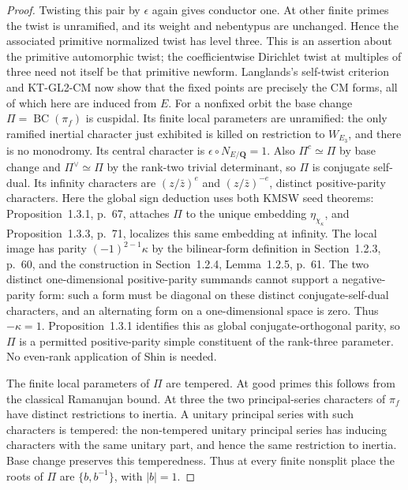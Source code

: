 \begin{proof}
Twisting this pair by $\epsilon$ again gives conductor one.
At other finite primes the twist is unramified, and its weight
and nebentypus are unchanged. Hence the associated primitive
normalized twist has level three. This is an assertion about
the primitive automorphic twist; the coefficientwise Dirichlet
twist at multiples of three need not itself be that primitive
newform.
Langlands's self-twist criterion and KT-GL2-CM now show that
the fixed points are precisely the CM forms, all of which here
are induced from $E$.
For a nonfixed orbit the base change $\Pi=\operatorname{BC}(\pi_f)$
is cuspidal. Its finite local parameters are unramified:
the only ramified inertial character just exhibited is killed
on restriction to $W_{E_3}$, and there is no monodromy.
Its central character is $\epsilon\circ N_{E/\mathbf Q}=1$.
Also $\Pi^c\simeq\Pi$ by base change and
$\Pi^\vee\simeq\Pi$ by the rank-two trivial determinant,
so $\Pi$ is conjugate self-dual.
Its infinity characters are $(z/\bar z)^e$ and $(z/\bar z)^{-e}$,
distinct positive-parity characters. Here the global sign deduction
uses both KMSW seed theorems: Proposition~1.3.1, p.~67,
attaches $\Pi$ to the unique embedding $\eta_{\chi_\kappa}$,
and Proposition~1.3.3, p.~71, localizes this same embedding
at infinity. The local image has parity $(-1)^{2-1}\kappa$
by the bilinear-form definition in Section~1.2.3, p.~60,
and the construction in Section~1.2.4, Lemma~1.2.5, p.~61.
The two distinct one-dimensional positive-parity summands
cannot support a negative-parity form: such a form must be
diagonal on these distinct conjugate-self-dual characters, and
an alternating form on a one-dimensional space is zero.
Thus $-\kappa=1$. Proposition~1.3.1 identifies this as
global conjugate-orthogonal parity, so $\Pi$ is a permitted
positive-parity simple constituent of the rank-three parameter.
No even-rank application of Shin is needed.

The finite local parameters of $\Pi$ are tempered. At good
primes this follows from the classical Ramanujan bound.
At three the two principal-series characters of $\pi_f$ have
distinct restrictions to inertia. A unitary principal series
with such characters is tempered: the non-tempered unitary
principal series has inducing characters with the same unitary
part, and hence the same restriction to inertia. Base change
preserves this temperedness. Thus at every finite nonsplit
place the roots of $\Pi$ are $\{b,b^{-1}\}$, with $|b|=1$.


\end{proof}
